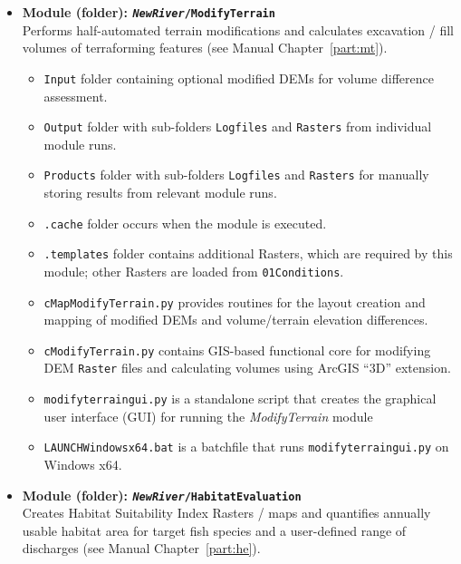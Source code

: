 \begin{itemize}
\begin{itemize}
		\item \texttt{LAUNCH{\myUnderscore}Windows{\myUnderscore}x64.bat} is a batchfile that runs \texttt{action{\myUnderscore}planner{\myUnderscore}gui.py}.
	\end{itemize}
	\item \textbf{Module (folder): \texttt{\textit{NewRiver}/ModifyTerrain}}\\
	Performs half-automated terrain modifications and calculates excavation / fill volumes of terraforming features (see Manual Chapter~\ref{part:mt}).
	\begin{itemize}
		\item \texttt{Input} folder containing optional modified DEMs for volume difference assessment.
		\item \texttt{Output} folder with sub-folders \texttt{Logfiles} and \texttt{Rasters} from individual module runs.
		\item \texttt{Products} folder with sub-folders \texttt{Logfiles} and \texttt{Rasters} for manually storing results from relevant module runs.
		\item \texttt{.cache} folder occurs when the module is executed.
		\item \texttt{.templates} folder contains additional Rasters, which are required by this module; other Rasters are loaded from \texttt{01{\myUnderscore}Conditions}.		
		\item \texttt{cMapModifyTerrain.py} provides routines for the layout creation and mapping of modified DEMs and volume/terrain elevation differences.
		\item \texttt{cModifyTerrain.py} contains GIS-based functional core for modifying DEM \texttt{Raster} files and calculating volumes using ArcGIS ``3D'' extension.		
		\item \texttt{modify{\myUnderscore}terrain{\myUnderscore}gui.py} is a standalone script that creates the graphical user interface (GUI) for running the \textit{ModifyTerrain} module
		\item \texttt{LAUNCH{\myUnderscore}Windows{\myUnderscore}x64.bat} is a batchfile that runs \texttt{modify{\myUnderscore}terrain{\myUnderscore}gui.py} on Windows x64.
	\end{itemize}
	\item \textbf{Module (folder): \texttt{\textit{NewRiver}/HabitatEvaluation}}\\
	Creates Habitat Suitability Index Rasters / maps and quantifies annually usable habitat area for target fish species and a user-defined range of discharges (see Manual Chapter~\ref{part:he}).

\end{itemize}
